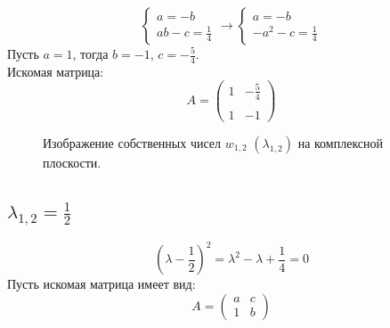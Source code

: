 \documentclass[a5paper, 10pt]{article}
\theoremstyle{definition}
\theoremstyle{plain}
\theoremstyle{remark}
\begin{document}
\begin{equation}
\begin{cases}
a = -b\\
ab - c = \frac{1}{4} 
\end{cases}
\to
\begin{cases}
a = -b\\
-a^2 - c = \frac{1}{4} 
\end{cases}
\end{equation}
Пусть $ a = 1$, тогда $b = -1$, $c = -\frac{5}{4} $.\\
Искомая матрица:
\begin{equation}
A =
\begin{pmatrix}
1 &  -\frac{5}{4}  \\
\\
1 & -1
\end{pmatrix}
\end{equation}
\begin{figure}[h!]
\caption{Изображение собственных чисел $w_{1, 2} \, \, \left( \lambda_{1, 2} \right)$ на комплексной плоскости.}
\end{figure}


\subsection{$\lambda_{1, 2} = \frac{1}{2}$}

\begin{equation}
\left( \lambda - \frac{1}{2}  \right)^2 = \lambda^2 - \lambda + \frac{1}{4} = 0
\end{equation}
Пусть искомая матрица имеет вид:
\begin{equation}
A =
\begin{pmatrix}
a & c \\
1 & b
\end{pmatrix}
\end{equation}
\end{document}
